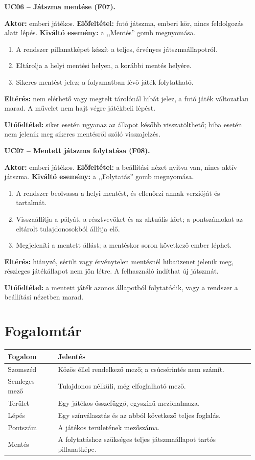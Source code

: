 \documentclass[11pt,a4paper]{article}
\begin{document}
\textbf{UC06 -- Játszma mentése (F07).}

\textbf{Aktor:} emberi játékos.
\textbf{Előfeltétel:} futó játszma, emberi kör, nincs feldolgozás alatt lépés.
\textbf{Kiváltó esemény:} a ,,Mentés'' gomb megnyomása.
\begin{enumerate}
\item A rendszer pillanatképet készít a teljes, érvényes játszmaállapotról.
\item Eltárolja a helyi mentési helyen, a korábbi mentés helyére.
\item Sikeres mentést jelez; a folyamatban lévő játék folytatható.
\end{enumerate}
\textbf{Eltérés:} nem elérhető vagy megtelt tárolónál hibát jelez,
  a futó játék változatlan marad. A művelet nem hajt végre játékbeli lépést.
\par\textbf{Utófeltétel:} siker esetén ugyanaz az állapot később visszatölthető;
  hiba esetén nem jelenik meg sikeres mentésről szóló visszajelzés.

\textbf{UC07 -- Mentett játszma folytatása (F08).}

\textbf{Aktor:} emberi játékos.
\textbf{Előfeltétel:} a beállítási nézet nyitva van, nincs aktív játszma.
\textbf{Kiváltó esemény:} a ,,Folytatás'' gomb megnyomása.
\begin{enumerate}
\item A rendszer beolvassa a helyi mentést, és ellenőrzi annak verzióját és tartalmát.
\item Visszaállítja a pályát, a résztvevőket és az aktuális kört;
  a pontszámokat az eltárolt tulajdonosokból állítja elő.
\item Megjeleníti a mentett állást; a mentéskor soron következő ember léphet.
\end{enumerate}
\textbf{Eltérés:} hiányzó, sérült vagy érvénytelen mentésnél hibaüzenet jelenik meg,
  részleges játékállapot nem jön létre. A felhasználó indíthat új játszmát.
\par\textbf{Utófeltétel:} a mentett játék azonos állapotból folytatódik,
  vagy a rendszer a beállítási nézetben marad.

\section{Fogalomtár}
\begin{tabularx}{\linewidth}{@{}lY@{}}
\toprule
Fogalom & Jelentés \\
\midrule
Szomszéd & Közös éllel rendelkező mező; a csúcsérintés nem számít. \\
Semleges mező & Tulajdonos nélküli, még elfoglalható mező. \\
Terület & Egy játékos összefüggő, egyszínű mezőhalmaza. \\
Lépés & Egy színválasztás és az abból következő teljes foglalás. \\
Pontszám & A játékos területének mezőszáma. \\
Mentés & A folytatáshoz szükséges teljes játszmaállapot tartós pillanatképe. \\
\bottomrule
\end{tabularx}
\end{document}
